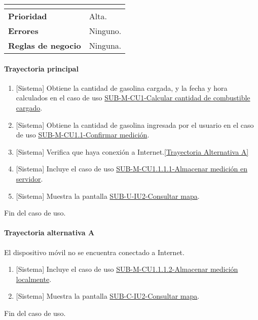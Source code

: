 \begin{longtable}{|J{5cm}|J{10.3cm}|}
\begin{itemize}
		\end{itemize} 
		\\ \hline 
	\textbf{Prioridad} & 
		Alta. \\ \hline
	\textbf{Errores} & Ninguno.
		\\ \hline
	\textbf{Reglas de negocio} & Ninguna.
		 \\ \hline
\end{longtable}

\paragraph{Trayectoria principal}
	\begin{enumerate}
		\item {[Sistema]} Obtiene la cantidad de gasolina cargada, y la fecha y hora calculados en el caso de uso \hyperref[SUB-M-CU1]{SUB-M-CU1-Calcular cantidad de combustible cargado}.
		\item {[Sistema]} Obtiene la cantidad de gasolina ingresada por el usuario en el caso de uso \hyperref[SUB-M-CU1.1]{SUB-M-CU1.1-Confirmar medición}.
		\item {[Sistema]} Verifica que haya conexión a Internet.\hyperref[SUB-M-CU1.1.1:TA]{[Trayectoria Alternativa A]}
		\item {[Sistema]} Incluye el caso de uso \hyperref[SUB-M-CU1.1.1.1]{SUB-M-CU1.1.1.1-Almacenar medición en servidor}.
		\item {[Sistema]} Muestra la pantalla \hyperref[fig:sub-c-iu2]{SUB-U-IU2-Consultar mapa}.
	\end{enumerate}
	Fin del caso de uso.

\paragraph{Trayectoria alternativa A} \label{SUB-M-CU1.1.1:TA}
	El dispositivo móvil no se encuentra conectado a Internet.
	\begin{enumerate}[label=A\arabic*.]
		\item {[Sistema]} Incluye el caso de uso \hyperref[SUB-M-CU1.1.1.2]{SUB-M-CU1.1.1.2-Almacenar medición localmente}.
		\item {[Sistema]} Muestra la pantalla \hyperref[fig:sub-c-iu2]{SUB-C-IU2-Consultar mapa}.
	\end{enumerate}
	Fin del caso de uso.
